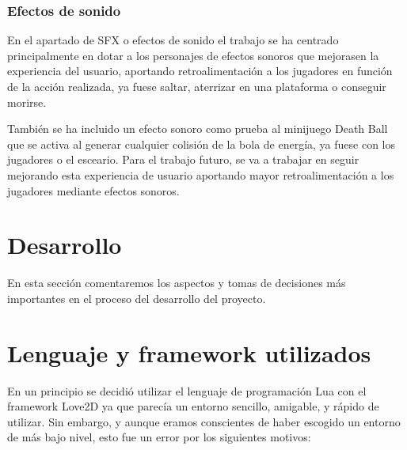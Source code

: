 \documentclass[12pt, spanish]{article}
\begin{document}
\subsubsection{Efectos de sonido}

En el apartado de SFX o efectos de sonido el trabajo se ha centrado principalmente en dotar a los personajes de efectos sonoros que mejorasen la experiencia del usuario, aportando retroalimentación a los jugadores en función de la acción realizada, ya fuese saltar, aterrizar en una plataforma o conseguir morirse.

También se ha incluido un efecto sonoro como prueba al minijuego Death Ball que se activa al generar cualquier colisión de la bola de energía, ya fuese con los jugadores o el esceario. Para el trabajo futuro, se va a trabajar en seguir mejorando esta experiencia de usuario aportando mayor retroalimentación a los jugadores mediante efectos sonoros.

\section*{Desarrollo}
\label{sec:desarrollo}

En esta sección comentaremos los aspectos y tomas de decisiones más importantes en el proceso del desarrollo del proyecto.

\section{Lenguaje y framework utilizados}

En un principio se decidió utilizar el lenguaje de programación Lua con el framework Love2D ya que parecía un entorno sencillo, amigable, y rápido de utilizar. Sin embargo, y aunque eramos conscientes de haber escogido un entorno de más bajo nivel, esto fue un error por los siguientes motivos:
\end{document}
